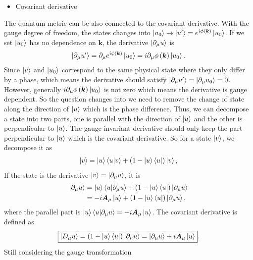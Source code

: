 \documentclass[12pt, oneside]{article}
\newcommand{\pr}{\prime}
\newcommand{\pa}{\partial}
\newcommand{\p}[1]{\left(#1\right)}
\numberwithin{equation}{subsection}
\begin{document}
\begin{itemize}
	\item Covariant derivative
\end{itemize}
The quantum metric can be also connected to the covariant derivative. With the gauge degree of freedom, the states changes into \(\ket{u_0} \rightarrow \ket{u^\pr} = e^{i \phi\p{\bm{k}}} \ket{u_0}\). If we set \(\ket{u_0}\) has no dependence on \(\bm{k}\), the derivative \(\ket{\pa_{\mu} u}\) is 
\begin{align}
	\ket{\pa_\mu u^\pr} = \pa_\mu e^{i \phi\p{\bm{k}}} \ket{u_0} = i \pa_\mu \phi \p{\bm{k}} \ket{u_0}.
\end{align}
Since \(\ket{u}\) and \(\ket{u_0}\) correspond to the same physical state where they only differ by a phase, which means the derivative should satisfy \(\ket{\pa_\mu u^\pr} = \ket{\pa_\mu u_0} = 0\). However, generally \(i \pa_\mu \phi \p{\bm{k}} \ket{u_0}\) is not zero which means the derivative is gauge dependent. So the question changes into we need to remove the change of state along the direction of \(\ket{u}\) which is the phase difference. Thus, we can decompose a state into two parts, one is parallel with the direction of \(\ket{u}\) and the other is perpendicular to \(\ket{u}\). The gauge-invariant derivative should only keep the part perpendicular to \(\ket{u}\) which is the covariant derivative. So for a state \(\ket{v}\), we decompose it as 
\begin{align}
	\ket{v}  = \ket{u} \braket{u | v} + \p{1 - \ket{u}\bra{u}} \ket{v},
\end{align}
If the state is the derivative \(\ket{v} = \ket{\pa_\mu u}\), it is 
\begin{align}
	\begin{split}
		\ket{\pa_\mu u} & = \ket{u}\braket{u | \pa_{\mu} u} + \p{1 - \ket{u}\bra{u}} \ket{\pa_\mu u} \\
		& = - i \bm{A}_\mu \ket{u} + \p{1 - \ket{u}\bra{u}} \ket{\pa_\mu u},
	\end{split} 
\end{align}
where the parallel part is \(\ket{u}\braket{u | \pa_{\mu} u}  = -i \bm{A}_{\mu} \ket{u}\). The covariant derivative is defined as
\begin{align}
	\begin{split}
		\boxed{\ket{D_{\mu} u} = \p{1 - \ket{u}\bra{u}} \ket{\pa_\mu u} = \ket{\pa_\mu u} + i \bm{A}_\mu \ket{u}}.
	\end{split}
\end{align}
Still considering the gauge transformation 
\end{document}
